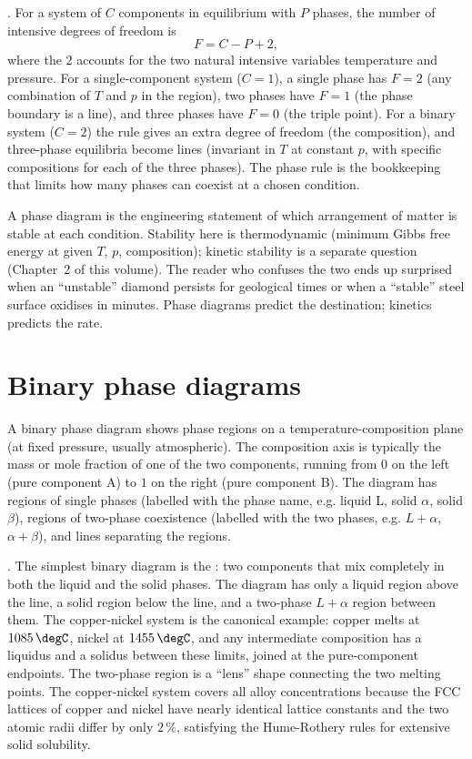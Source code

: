 . For a system of $C$ components in
equilibrium with $P$ phases, the number of intensive degrees of
freedom is
\[
F = C - P + 2,
\]
where the $2$ accounts for the two natural intensive variables
temperature and pressure. For a single-component system ($C = 1$),
a single phase has $F = 2$ (any combination of $T$ and $p$ in the
region), two phases have $F = 1$ (the phase boundary is a line), and
three phases have $F = 0$ (the triple point). For a binary system
($C = 2$) the rule gives an extra degree of freedom (the composition),
and three-phase equilibria become lines (invariant in $T$ at constant
$p$, with specific compositions for each of the three phases). The
phase rule is the bookkeeping that limits how many phases can
coexist at a chosen condition.

\begin{archetype}[Stability]
A phase diagram is the engineering statement of which arrangement of
matter is stable at each condition. Stability here is thermodynamic
(minimum Gibbs free energy at given $T$, $p$, composition);
kinetic stability is a separate question (Chapter~2 of this volume).
The reader who confuses the two ends up surprised when an
``unstable'' diamond persists for geological times or when a
``stable'' steel surface oxidises in minutes. Phase diagrams
predict the destination; kinetics predicts the rate.
\end{archetype}

\section{Binary phase diagrams}

A binary phase diagram shows phase regions on a temperature-composition
plane (at fixed pressure, usually atmospheric). The composition axis is
typically the mass or mole fraction of one of the two components,
running from $0$ on the left (pure component A) to $1$ on the right
(pure component B). The diagram has regions of single phases (labelled
with the phase name, e.g. liquid L, solid $\alpha$, solid $\beta$),
regions of two-phase coexistence (labelled with the two phases, e.g.
$L + \alpha$, $\alpha + \beta$), and lines separating the regions.

. The simplest binary diagram is the
: two components that mix completely in
both the liquid and the solid phases. The diagram has only a liquid
region above the  line, a solid region below the
 line, and a two-phase $L + \alpha$ region between
them. The copper-nickel system is the canonical example: copper melts
at $1085\,\degC$, nickel at $1455\,\degC$, and any intermediate
composition has a liquidus and a solidus between these limits, joined
at the pure-component endpoints. The two-phase region is a ``lens''
shape connecting the two melting points. The copper-nickel system
covers all alloy concentrations because the FCC lattices of copper and
nickel have nearly identical lattice constants and the two atomic
radii differ by only $2\,\%$, satisfying the Hume-Rothery rules for
extensive solid solubility.

